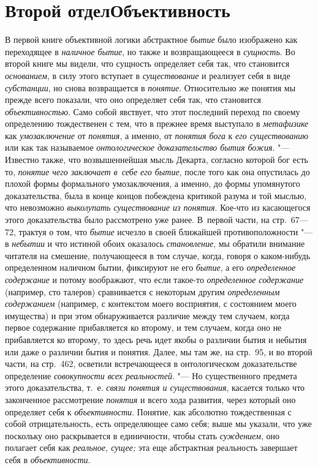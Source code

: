 \bigskip
\clearpage

\part[Второй отдел\newline ОБЪЕКТИВНОСТЬ]{Второй отдел\newline Объективность}

В первой книге объективной логики абстрактное {\em бытие} было
изображено как переходящее в {\em наличное бытие}, но
также и возвращающееся в {\em сущность}. Во второй
книге мы видели, что сущность определяет себя так, что становится
{\em основанием}, в силу этого вступает в {\em существование}
и реализует себя в виде {\em субстанции}, но
снова возвращается в {\em понятие}.
Относительно же понятия мы прежде всего показали, что оно
определяет себя так, что становится {\em объективностью}.
Само собой явствует, что этот последний переход по своему
определению тождественен с тем, что в прежнее время выступало в
{\em метафизике} как {\em умозаключение} от {\em понятия}, а именно,
от {\em понятия бога} к {\em его существованию} или как так называемое
{\em онтологическое доказательство бытия
божия}. "--- Известно также, что возвышеннейшая мысль Декарта,
согласно которой бог есть то, {\em понятие чего заключает в~себе его
бытие}, после того как она опустилась до плохой формы
формального умозаключения, а именно, до формы упомянутого доказательства,
была в конце концов побеждена критикой разума и той мыслью, что невозможно
{\em выколупать существование из
понятия}. Кое-что из касающегося этого доказательства было
рассмотрено уже ранее. В~первой части, на стр.~67---72, трактуя о том, что
{\em бытие} исчезло в своей ближайшей противоположности "--- в
{\em небытии} и что истиной обоих оказалось {\em становление}, мы
обратили внимание читателя на смешение, получающееся в том случае, когда,
говоря о каком-нибудь определенном наличном бытии, фиксируют не его
{\em бытие}, а его {\em определенное содержание}
и потому воображают, что если такое-то {\em определенное содержание}
(например, сто талеров) сравнивается с некоторым другим
{\em определенным содержанием}
(например, с контекстом моего восприятия, с состоянием моего
имущества) и при этом обнаруживается различие между тем случаем, когда
первое содержание прибавляется ко второму, и тем случаем, когда оно не
прибавляется ко второму, то здесь речь идет якобы о различии бытия и
небытия или даже о различии бытия и понятия. Далее, мы там же, на стр.~95,
и во второй части, на стр.~462, осветили встречающееся в онтологическом
доказательстве определение {\em совокупности всех реальностей}. "---
Но существенного предмета этого доказательства, т.~е.
{\em связи понятия и существования},
касается только что законченное рассмотрение {\em понятия} и всего
хода развития, через который оно определяет себя к {\em объективности}.
Понятие, как абсолютно тождественная с собой отрицательность,
есть определяющее само себя; выше мы указали, что уже поскольку оно
раскрывается в единичности, чтобы стать {\em суждением}, оно
полагает себя как {\em реальное, сущее;} эта еще
абстрактная реальность завершает себя в {\em объективности}.

